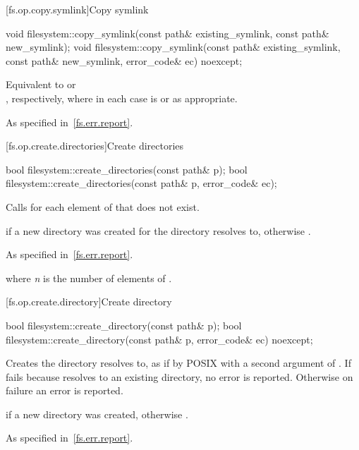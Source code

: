 [fs.op.copy.symlink]{Copy symlink}

%
\begin{itemdecl}
void filesystem::copy_symlink(const path& existing_symlink, const path& new_symlink);
void filesystem::copy_symlink(const path& existing_symlink, const path& new_symlink,
                              error_code& ec) noexcept;
\end{itemdecl}

\begin{itemdescr}
\pnum
\effects
Equivalent to
 or\\
, respectively,
  where in each case  is  or
   as appropriate.

\pnum
\throws
As specified in~\ref{fs.err.report}.
\end{itemdescr}


[fs.op.create.directories]{Create directories}

%
\begin{itemdecl}
bool filesystem::create_directories(const path& p);
bool filesystem::create_directories(const path& p, error_code& ec);
\end{itemdecl}

\begin{itemdescr}
\pnum
\effects
Calls  for each element of 
  that does not exist.

\pnum
\returns
{} if a new directory was created
  for the directory  resolves to,
  otherwise .

\pnum
\throws
As specified in~\ref{fs.err.report}.

\pnum
\complexity
{} where \textit{n} is the number of elements
  of .
\end{itemdescr}


[fs.op.create.directory]{Create directory}

%
\begin{itemdecl}
bool filesystem::create_directory(const path& p);
bool filesystem::create_directory(const path& p, error_code& ec) noexcept;
\end{itemdecl}

\begin{itemdescr}
\pnum
\effects
Creates the directory  resolves to,
  as if by POSIX  with a second argument of
  .
  If  fails because  resolves to an existing directory,
  no error is reported. Otherwise on failure an error is reported.

\pnum
\returns
{} if a new directory was created, otherwise .

\pnum
\throws
As specified in~\ref{fs.err.report}.
\end{itemdescr}

